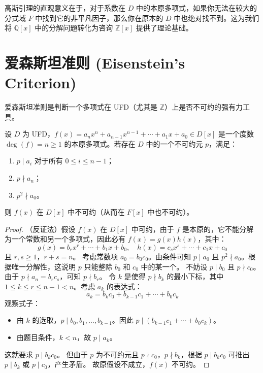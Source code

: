 \documentclass[11pt]{article}
\begin{document}
\begin{remark}
高斯引理的直观意义在于，对于系数在 $D$ 中的本原多项式，如果你无法在较大的分式域 $F$ 中找到它的非平凡因子，那么你在原本的 $D$ 中也绝对找不到。这为我们将 $\mathbb{Q}[x]$ 中的分解问题转化为咨询 $\mathbb{Z}[x]$ 提供了理论基础。
\end{remark}

\section{爱森斯坦准则 (Eisenstein's Criterion)}

爱森斯坦准则是判断一个多项式在 UFD（尤其是 $\mathbb{Z}$）上是否不可约的强有力工具。

\begin{cntheorem}[爱森斯坦准则]
设 $D$ 为 UFD，$f(x) = a_n x^n + a_{n-1} x^{n-1} + \cdots + a_1 x + a_0 \in D[x]$ 是一个度数 $\deg(f) = n \ge 1$ 的本原多项式。若存在 $D$ 中的一个不可约元 $p$，满足：
\begin{enumerate}
    \item $p \mid a_i$ 对于所有 $0 \le i \le n-1$；
    \item $p \nmid a_n$；
    \item $p^2 \nmid a_0$。
\end{enumerate}
则 $f(x)$ 在 $D[x]$ 中不可约（从而在 $F[x]$ 中也不可约）。
\end{cntheorem}

\begin{proof}
（反证法）假设 $f(x)$ 在 $D[x]$ 中可约，由于 $f$ 是本原的，它不能分解为一个常数和另一个多项式，因此必有 $f(x) = g(x)h(x)$，其中：
$$ g(x) = b_r x^r + \cdots + b_1 x + b_0, \quad h(x) = c_s x^s + \cdots + c_1 x + c_0 $$
且 $r, s \ge 1$，$r + s = n$。
考虑常数项 $a_0 = b_0 c_0$。由条件可知 $p \mid a_0$ 且 $p^2 \nmid a_0$。根据唯一分解性，这说明 $p$ 只能整除 $b_0$ 和 $c_0$ 中的某一个。
不妨设 $p \mid b_0$ 且 $p \nmid c_0$。
由于 $p \nmid a_n = b_r c_s$，可知 $p \nmid b_r$。
令 $k$ 是使得 $p \nmid b_k$ 的最小下标，其中 $1 \le k \le r \le n-1 < n$。考虑 $a_k$ 的表达式：
$$ a_k = b_k c_0 + b_{k-1} c_1 + \cdots + b_0 c_k $$
观察式子：
\begin{itemize}
    \item 由 $k$ 的选取，$p \mid b_0, b_1, \dots, b_{k-1}$。因此 $p \mid (b_{k-1} c_1 + \cdots + b_0 c_k)$。
    \item 由题目条件，$k < n$，故 $p \mid a_k$。
\end{itemize}
这就要求 $p \mid b_k c_0$。
但由于 $p$ 为不可约元且 $p \nmid c_0$，$p \nmid b_k$，根据 $p \mid b_k c_0$ 可推出 $p \mid b_k$ 或 $p \mid c_0$，产生矛盾。
故原假设不成立，$f(x)$ 不可约。
\end{proof}
\end{document}
